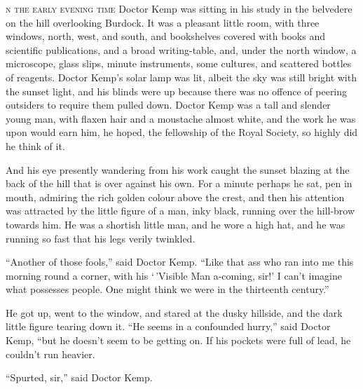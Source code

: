 \label{ch:15}
\begin{ChapterStart}
\vspace*{2\nbs}

\vspace{1.5\nbs}
\vspace{0.75\nbs}
\end{ChapterStart}

\kern-6pt\textsc{n the early evening time} Doctor Kemp was sitting in his study in the belvedere on the hill overlooking Burdock. It was a pleasant little room, with three windows, north, west, and south, and bookshelves covered with books and scientific publications, and a broad writing-table, and, under the north window, a microscope, glass slips, minute instruments, some cultures, and scattered bottles of reagents. Doctor Kemp’s solar lamp was lit, albeit the sky was still bright with the sunset light, and his blinds were up because there was no offence of peering outsiders to require them pulled down. Doctor Kemp was a tall and slender young man, with flaxen hair and a moustache almost white, and the work he was upon would earn him, he hoped, the fellowship of the Royal Society, so highly did he think of it.

And his eye presently wandering from his work caught the sunset blazing at the back of the hill that is over against his own. For a minute perhaps he sat, pen in mouth, admiring the rich golden colour above the crest, and then his attention was attracted by the little figure of a man, inky black, running over the hill-brow towards him. He was a shortish little man, and he wore a high hat, and he was running so fast that his legs verily twinkled.

“Another of those fools,” said Doctor Kemp. “Like that ass who ran into me this morning round a corner, with his ‘\,’Visible Man a-coming, sir!’ I can’t imagine what possesses people. One might think we were in the thirteenth century.”

He got up, went to the window, and stared at the dusky hillside, and the dark little figure tearing down it. “He seems in a confounded hurry,” said Doctor Kemp, “but he doesn’t seem to be getting on. If his pockets were full of lead, he couldn’t run heavier.

“Spurted, sir,” said Doctor Kemp.

